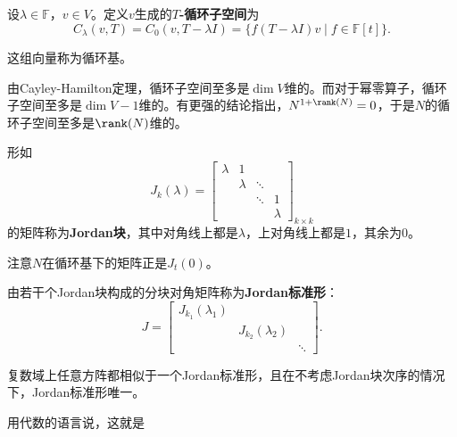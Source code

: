 \begin{definition}[$T$-循环子空间]
    设$\lambda \in \mathbb{F}$，$v \in V$。定义$v$生成的\textbf{$T$-循环子空间}为
    \begin{equation}
        C_{\lambda}(v, T) = C_0(v, T-\lambda I) = \{f(T-\lambda I)v \mid f \in \mathbb{F}[t]\}.
    \end{equation}
\end{definition}
这组向量称为循环基。

由Cayley-Hamilton定理，循环子空间至多是$\dim V$维的。而对于幂零算子，循环子空间至多是$\dim V-1$维的。有更强的结论指出，$N^{1+\rank(N)}=0$，于是$N$的循环子空间至多是$\rank(N)$维的。

\begin{definition}[Jordan块]
    形如
    \begin{equation}
        J_k(\lambda) = \begin{bmatrix}
            \lambda & 1       &        &         \\
                    & \lambda & \ddots &         \\
                    &         & \ddots & 1       \\
                    &         &        & \lambda
        \end{bmatrix}_{k \times k}
    \end{equation}
    的矩阵称为\textbf{Jordan块}，其中对角线上都是$\lambda$，上对角线上都是$1$，其余为$0$。
\end{definition}
注意$N$在循环基下的矩阵正是$J_t(0)$。
\begin{definition}[Jordan标准形]
    由若干个Jordan块构成的分块对角矩阵称为\textbf{Jordan标准形}：
    \begin{equation}
        J = \begin{bmatrix}
            J_{k_1}(\lambda_1) &                    &        \\
                               & J_{k_2}(\lambda_2) &        \\
                               &                    & \ddots
        \end{bmatrix}.
    \end{equation}
\end{definition}

\begin{theorem}[Jordan标准形定理]
    复数域上任意方阵都相似于一个Jordan标准形，且在不考虑Jordan块次序的情况下，Jordan标准形唯一。
\end{theorem}
用代数的语言说，这就是

